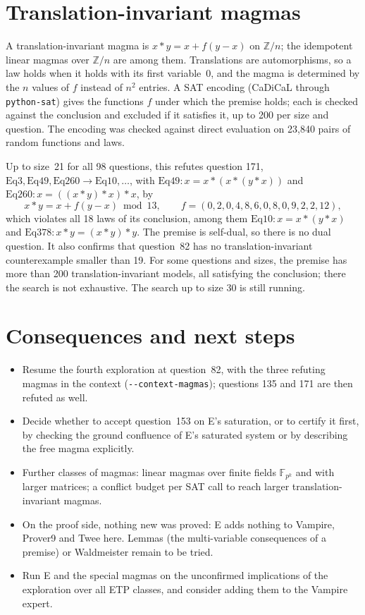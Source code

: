 \documentclass[11pt,a4paper]{article}
\newcommand{\code}[1]{\texttt{#1}}
\newcommand{\Eq}[1]{\mathrm{Eq}#1}
\newcommand{\Z}{\mathbb{Z}}
\begin{document}
\section{Translation-invariant magmas}

A translation-invariant magma is $x * y = x + f(y - x)$ on $\Z/n$; the idempotent linear magmas
over $\Z/n$ are among them. Translations are automorphisms, so a law holds when it holds with its first
variable~0, and the magma is determined by the $n$ values of $f$ instead of $n^2$ entries. A SAT
encoding (CaDiCaL through \code{python-sat}) gives the functions $f$ under which the premise holds; each
is checked against the conclusion and excluded if it satisfies it, up to 200 per size and question.
The encoding was checked against direct evaluation on 23,840 pairs of random functions and laws.

Up to size~21 for all 98 questions, this refutes question 171,
$\Eq{3}, \Eq{49}, \Eq{260} \to \Eq{10}, \dots$, with $\Eq{49}\colon x = x * (x * (y * x))$ and
$\Eq{260}\colon x = ((x * y) * x) * x$, by
\[
x * y = x + f(y - x) \bmod 13, \qquad f = (0, 2, 0, 4, 8, 6, 0, 8, 0, 9, 2, 2, 12),
\]
which violates all 18 laws of its conclusion, among them $\Eq{10}\colon x = x * (y * x)$ and
$\Eq{378}\colon x * y = (x * y) * y$. The premise is self-dual, so there is no dual question.
It also confirms that question~82 has no translation-invariant counterexample smaller than 19.
For some questions and sizes, the premise has more than 200 translation-invariant models, all
satisfying the conclusion; there the search is not exhaustive. The search up to size 30 is still
running.

\section{Consequences and next steps}

\begin{itemize}
  \item Resume the fourth exploration at question~82, with the three refuting magmas in the context
        (\code{-{}-context-magmas}); questions 135 and 171 are then refuted as well.
  \item Decide whether to accept question~153 on E's saturation, or to certify it first, by checking
        the ground confluence of E's saturated system or by describing the free magma explicitly.
  \item Further classes of magmas: linear magmas over finite fields $\mathbb{F}_{p^k}$ and with larger
        matrices; a conflict budget per SAT call to reach larger translation-invariant magmas.
  \item On the proof side, nothing new was proved: E adds nothing to Vampire, Prover9 and Twee here.
        Lemmas (the multi-variable consequences of a premise) or Waldmeister remain to be tried.
  \item Run E and the special magmas on the unconfirmed implications of the exploration over all ETP
        classes, and consider adding them to the Vampire expert.
\end{itemize}
\end{document}
